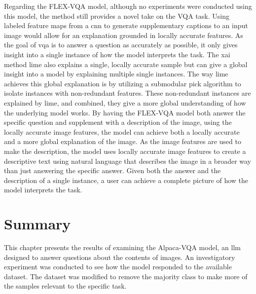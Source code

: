 Regarding the FLEX-VQA model, although no experiments were conducted using this model, the method still provides a novel take on the VQA task. Using labeled feature maps from a \gls{cnn} to generate supplementary captions to an input image would allow for an explanation grounded in locally accurate features.
As the goal of \gls{vqa} is to answer a question as accurately as possible, it only gives insight into a single instance of how the model interprets the task. The \gls{xai} method \gls{lime} also explains a single, locally accurate sample but can give a global insight into a model by explaining multiple single instances. The way \gls{lime} achieves this global explanation is by utilizing a submodular pick algorithm to isolate instances with non-redundant features. These non-redundant instances are explained by \gls{lime}, and combined, they give a more global understanding of how the underlying model works.
By having the FLEX-VQA model both answer the specific question and supplement with a description of the image, using the locally accurate image features, the model can achieve both a locally accurate and a more global explanation of the image. As the image features are used to make the description, the model uses locally accurate image features to create a descriptive text using natural language that describes the image in a broader way than just answering the specific answer. Given both the answer and the description of a single instance, a user can achieve a complete picture of how the model interprets the task.


\section{Summary}
\label{sec4:summary}

This chapter presents the results of examining the Alpaca-VQA model, an \gls{llm} designed to answer questions about the contents of images. An investigatory experiment was conducted to see how the model responded to the available dataset. The dataset was modified to remove the majority class to make more of the samples relevant to the specific task.

